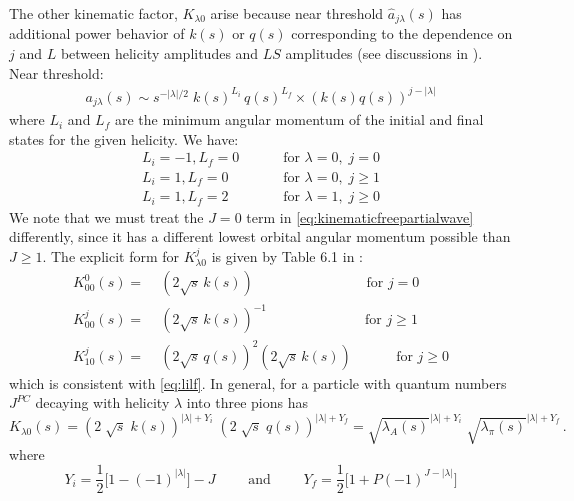 \documentclass[10pt, aps,prd,amsmath,amssymb,superscriptaddress,onecolumn,
nofootinbib,showpacs,preprintnumbers]{revtex4-1}
\newcommand{\mand}{\qquad \text{ and } \qquad}
\begin{document}
The other kinematic factor, \(K_{\lambda0}\) arise  because near threshold \(\hat{a}_{j\lambda}(s)\) has additional power behavior of \(k(s)\) or \(q(s)\) corresponding to the dependence on \(j\) and \(L\) between helicity amplitudes and \(LS\) amplitudes (see discussions in \cite{Jackson1968,Franklin1966}). Near threshold:
  \begin{gather}
    a_{j\lambda}(s) \sim s^{-|\lambda|/2} \; k(s)^{L_i} \, q(s)^{L_f} \times (k(s)q(s))^{j- |\lambda|}
  \end{gather}
where \(L_i\) and \(L_f\) are the minimum angular momentum of the initial and final states for the given helicity. We have:
  \begin{align}
      L_i = -1, L_f = 0 &\qquad  \text{ for } \lambda = 0, \; j = 0   \nonumber \\
      L_i = 1, L_f = 0 &\qquad  \text{ for } \lambda = 0, \;  j \label{eq:lilf} \geq 1  \\
      L_i = 1 , L_f = 2& \qquad  \text{ for } \lambda = 1, \; j \geq 0 \nonumber
  \end{align}
We note that we must treat the \(J=0\) term in \cref{eq:kinematicfreepartialwave} differently, since it has a different lowest orbital angular momentum possible than \(J\geq 1\). The explicit form for \(K^j_{\lambda0}\) is given by Table 6.1 in \cite{Collins}:
  \begin{align}
    \label{eq:k-factor}
    K^0_{00}(s) =& \;  ( 2\sqrt{s} \, k(s)) \qquad \qquad \qquad \quad \; \, \;
    \text{  for } j=0 \nonumber \\
    K^j_{00 }(s) =& \; ( 2\sqrt{s} \, k(s))^{-1} \qquad \qquad \qquad \quad
    \text{for } j\geq 1\\ \nonumber
    K^j_{10}(s) =& \; (2  \sqrt{s} \, q(s))^2  (2  \sqrt{s} \, k(s)) \qquad \; \; \;\text{ for } j\geq 0
  \end{align}
which is consistent with \cref{eq:lilf}. In general, for a particle with quantum numbers \(J^{PC}\) decaying with helicity \(\lambda\) into three pions has
  \begin{equation}
    K_{\lambda 0}(s) = (2 \; \sqrt{s} \; k(s))^{|\lambda| + Y_i} \; (2 \; \sqrt{s} \; q(s))^{|\lambda| + Y_f} = \sqrt{\lambda_A(s)}^{|\lambda| + Y_i} \; \sqrt{\lambda_\pi(s)}^{|\lambda| + Y_f}\, .
  \end{equation}
where
  \begin{equation}
    Y_i =  \frac{1}{2} \big[ 1 - (-1)^{|\lambda|}\big] - J \mand Y_f =  \frac{1}{2} \big[ 1 + P (-1)^{J- |\lambda|}]
  \end{equation}
\end{document}
